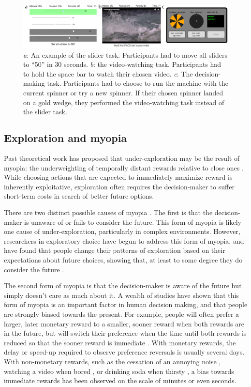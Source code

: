 \documentclass[10pt,letterpaper]{article}
\begin{document}
\begin{figure}
\centering
\includegraphics[width=\textwidth]{figures/taskpictures.png}
\caption{\emph{a}: An example of the slider task. Participants had to move all
  sliders to ``50'' in 30 seconds. \emph{b}: the video-watching task.
  Participants had to hold the space bar to watch their chosen video. \emph{c}:
  The decision-making task. Participants had to choose to run the machine with
  the current spinner or try a new spinner. If their chosen spinner landed on
  a gold wedge, they performed the video-watching task instead of the
  slider task.}
\label{fig:taskpictures}
\end{figure}

\subsection{Exploration and myopia}

Past theoretical work has proposed that under-exploration may be the result of myopia: the
underweighting of temporally distant rewards relative to close ones \citep{March1991, Levinthal1993}. 
While
choosing actions that are expected to immediately maximize reward is inherently
exploitative, exploration often requires the decision-maker to suffer short-term
costs in search of better future options.

There are two distinct possible causes of myopia \citep{Bartels2015}. The first is that the decision-maker is
unaware of or fails to consider the future. This form of myopia is likely one
cause of under-exploration, particularly in complex environments. However,
researchers in exploratory choice have begun to address this form of myopia, and
have found that people change their
patterns of exploration based on their expectations about future choices,
showing that, at least to some degree they do consider the future \citep{Meyer1995, Wilson2014a, Rich2017}.

The second form of myopia is that the decision-maker
is aware of the future but simply doesn't care as much about it.
A wealth of studies have shown that this form of myopia is an important factor
in human decision making, and that people are strongly
biased towards  the present. For example, people will often prefer a larger, later monetary
reward to a smaller, sooner reward when both rewards are in the future, but will
switch their preference when the time until both rewards is reduced so that the
sooner reward is immediate \citep{Kirby1995}. With monetary rewards, the delay
or speed-up required to observe preference reversals is usually several days. With non-monetary rewards,
such as the cessation of an annoying noise \citep{Solnick1980}, watching a video
when bored \citep{Navarick1998}, or drinking soda
when thirsty \citep{Brown2009}, a bias towards immediate rewards has been observed on the scale of
minutes or even seconds.
\end{document}
